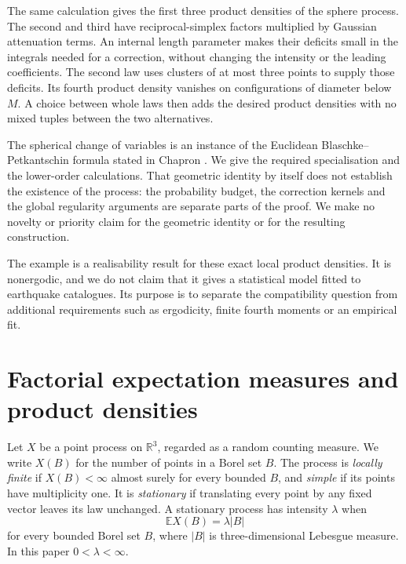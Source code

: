 \documentclass[11pt,a4paper]{article}
\numberwithin{equation}{section}
\theoremstyle{definition}
\theoremstyle{remark}
\newcommand{\R}{\mathbb R}
\newcommand{\E}{\mathbb E}
\begin{document}
The same calculation gives the first three product densities of the
sphere process. The second and third have reciprocal-simplex factors
multiplied by Gaussian attenuation terms. An internal length parameter
makes their deficits small in the integrals needed for a correction,
without changing the intensity or the leading coefficients. The second
law uses clusters of at most three points to supply those deficits. Its
fourth product density vanishes on configurations of diameter below $M$.
A choice between whole laws then adds the desired product densities with
no mixed tuples between the two alternatives.

The spherical change of variables is an instance of the Euclidean
Blaschke--Petkantschin formula stated in Chapron
\cite[equation (1)]{Chapron2018}. We give the required specialisation and
the lower-order calculations. That geometric identity by itself does not
establish the existence of the process: the probability budget, the
correction kernels and the global regularity arguments are separate parts
of the proof. We make no novelty or priority claim for the geometric
identity or for the resulting construction.

The example is a realisability result for these exact local product
densities. It is nonergodic, and we do not claim that it gives a statistical
model fitted to earthquake catalogues. Its purpose is to separate the
compatibility question from additional requirements such as ergodicity,
finite fourth moments or an empirical fit.

\section{Factorial expectation measures and product densities}
\label{sec:preliminaries}

Let $X$ be a point process on $\R^3$, regarded as a random counting measure.
We write $X(B)$ for the number of points in a Borel set $B$. The process is
\emph{locally finite} if $X(B)<\infty$ almost surely for every bounded $B$,
and \emph{simple} if its points have multiplicity one. It is
\emph{stationary} if translating every point by any fixed vector leaves
its law unchanged. A stationary process has intensity $\lambda$ when
\begin{equation}
 \E X(B)=\lambda |B|
 \label{eq:intensity-def}
\end{equation}
for every bounded Borel set $B$, where $|B|$ is three-dimensional Lebesgue
measure. In this paper $0<\lambda<\infty$.
\end{document}
